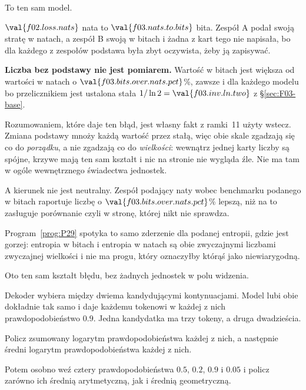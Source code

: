 \begin{fr}
\begin{ansblock}
To ten sam model.

$\val{f02.loss.nats}$ nata to $\val{f03.nats.to.bits}$ bita. Zespół A podał
swoją stratę w natach, a zespół B swoją w bitach i żadna z kart tego nie
napisała, bo dla każdego z zespołów podstawa była zbyt oczywista, żeby ją
zapisywać.
\end{ansblock}

\begin{trapbox}
\textbf{Liczba bez podstawy nie jest pomiarem.} Wartość w bitach jest większa
od wartości w natach o $\val{f03.bits.over.nats.pct}$\%, zawsze i dla każdego
modelu \dash{} bo przelicznikiem jest ustalona stała
$1 / \ln 2 = \val{f03.inv.ln.two}$ z \S\ref{sec:F03-base}.

Rozumowaniem, które daje ten błąd, jest własny fakt z ramki~11 użyty wstecz.
Zmiana podstawy mnoży każdą wartość przez stałą, więc obie skale zgadzają się
co do \emph{porządku}, a nie zgadzają co do \emph{wielkości}: wewnątrz jednej
karty liczby są spójne, krzywe mają ten sam kształt i nic na stronie nie
wygląda źle. Nie ma tam w ogóle wewnętrznego świadectwa jednostek.

A kierunek nie jest neutralny. Zespół podający naty wobec benchmarku podanego w
bitach raportuje liczbę o $\val{f03.bits.over.nats.pct}$\% lepszą, niż na to
zasługuje porównanie \dash{} czyli w stronę, której nikt nie sprawdza.
\end{trapbox}

Program~\ref{prog:P29} spotyka to samo zderzenie dla podanej entropii, gdzie
jest gorzej: entropia w bitach i entropia w natach są obie zwyczajnymi liczbami
zwyczajnej wielkości i nie ma progu, który oznaczyłby którąś jako
niewiarygodną.
\end{fr}

\begin{fr}
Oto ten sam kształt błędu, bez żadnych jednostek w polu widzenia.

Dekoder wybiera między dwiema kandydującymi kontynuacjami. Model lubi obie
dokładnie tak samo i daje każdemu tokenowi w każdej z nich prawdopodobieństwo
$\num{0.9}$. Jedna kandydatka ma trzy tokeny, a druga dwadzieścia.

Policz zsumowany logarytm prawdopodobieństwa każdej z nich, a następnie średni
logarytm prawdopodobieństwa każdej z nich.

Potem osobno weź cztery prawdopodobieństwa $\num{0.5}$, $\num{0.2}$,
$\num{0.9}$ i $\num{0.05}$ i policz zarówno ich średnią arytmetyczną, jak i
średnią geometryczną.
\dotline
\nextframe
\end{fr}


